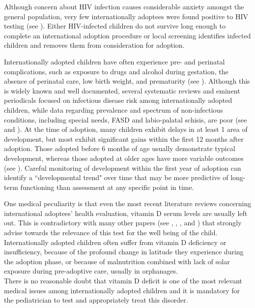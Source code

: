 Although concern about HIV infection causes considerable anxiety amongst the general population, very few internationally adoptees  were found positive to HIV testing (see \cite{caringfor}). Either HIV-infected children do not survive long enough to complete an international adoption procedure or local screening identifies infected children and removes them from consideration for adoption.

Internationally adopted children have often experience pre- and perinatal complications, such as exposure to drugs and alcohol during gestation, the absence of perinatal care, low birth weight, and prematurity (see \cite{preventing}). Although this is widely known and well documented, several systematic reviews and eminent periodicals focused on infectious disease risk among internationally adopted children, while data regarding prevalence and spectrum of non-infectious conditions, including special needs, FASD and labio-palatal schisis, are poor (see \cite{notonlyinfectious} and \cite{nonsoloinfezioni}). At the time of adoption, many children exhibit delays in at least 1 area of development, but most exhibit significant gains within the first 12 months after adoption. Those adopted before 6 months of age usually demonstrate typical development, whereas those adopted at older ages have more variable outcomes (see \cite{nelson}). Careful monitoring of development within the first year of adoption can identify a ``developmental trend" over time that may be more predictive of long-term functioning than assessment at any specific point in time. 

One medical peculiarity is that even the most recent literature reviews concerning international adoptees' health evaluation, vitamin D serum levels are usually left out. This is contradictory with many other papers (see \cite{vitDadopt1}, \cite{vitDadopt2}, \cite{vitDadopt3}, and \cite{vitDadopt4}) that strongly advise towards the relevance of this test for the well being of the child. Internationally adopted children often suffer from vitamin D deficiency or insufficiency, because of the profound change in latitude they experience during the adoption phase, or because of malnutrition combined with lack of solar exposure during pre-adoptive care, usually in orphanages.\\
There is no reasonable doubt that vitamin D deficit is one of the most relevant medical issues among internationally adopted children and it is mandatory for the pediatrician to test and appropriately treat this disorder.

